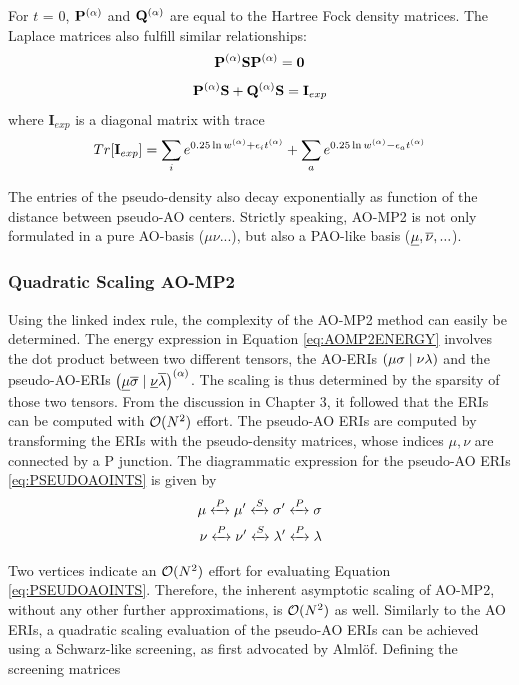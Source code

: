 \noindent For $t$ = 0, $\mathbf{P}^{(\alpha)}$ and $\mathbf{Q}^{(\alpha)}$ are equal to the Hartree Fock density matrices. The Laplace matrices also fulfill similar relationships:
\begin{equation}
\mathbf{P}^{(\alpha)} \mathbf{S} \mathbf{P}^{(\alpha)} = \mathbf{0}
\label{eq:PSP0}
\end{equation}
\begin{equation}
\mathbf{P}^{(\alpha)} \mathbf{S} + \mathbf{Q}^{(\alpha)} \mathbf{S} = \mathbf{I}_{exp}
\end{equation}
\noindent where $\mathbf{I}_{exp}$ is a diagonal matrix with trace
\begin{equation}
Tr[\mathbf{I}_{exp}] = \sum_i e^{0.25 \ln w^{(\alpha)} + \epsilon_i t^{(\alpha)}} + \sum_a e^{0.25 \ln w^{(\alpha)} - \epsilon_a t^{(\alpha)}}
\end{equation}

\noindent The entries of the pseudo-density also decay exponentially as function of the distance between pseudo-AO centers. Strictly speaking, AO-MP2 is not only formulated in a pure AO-basis ($\mu\nu...$), but also a PAO-like basis ($\underline{\mu},\overline{\nu},...$). 

\subsubsection{Quadratic Scaling AO-MP2}

Using the linked index rule, the complexity of the AO-MP2 method can easily be determined. The energy expression in Equation \ref{eq:AOMP2ENERGY} involves the dot product between two different tensors, the AO-ERIs $\left( \mu\sigma \mid \nu\lambda \right)$ and the pseudo-AO-ERIs $\left( \underline{\mu}\overline{\sigma} \mid \underline{\nu}\overline{\lambda} \right)^{(\alpha)}$. The scaling is thus determined by the sparsity of those two tensors. From the discussion in Chapter 3, it followed that the ERIs can be computed with $\mathcal{O}(N^{2})$ effort. The pseudo-AO ERIs are computed by transforming the ERIs with the pseudo-density matrices, whose indices $\mu,\nu$ are connected by a P junction. The diagrammatic expression for the pseudo-AO ERIs \ref{eq:PSEUDOAOINTS} is given by
\begin{equation}
\begin{split}
\mu \xleftrightarrow{P} \mu' \xleftrightarrow{S} \sigma' \xleftrightarrow{P} \sigma \\
\nu \xleftrightarrow{P} \nu' \xleftrightarrow{S} \lambda' \xleftrightarrow{P} \lambda
\end{split}
\end{equation}

\noindent Two vertices indicate an $\mathcal{O}(N^{2})$ effort for evaluating Equation \ref{eq:PSEUDOAOINTS}. Therefore, the inherent asymptotic scaling of AO-MP2, without any other further approximations, is $\mathcal{O}(N^{2})$ as well. Similarly to the AO ERIs, a quadratic scaling evaluation of the pseudo-AO ERIs can be achieved using a Schwarz-like screening, as first advocated by Almlöf. Defining the screening matrices

